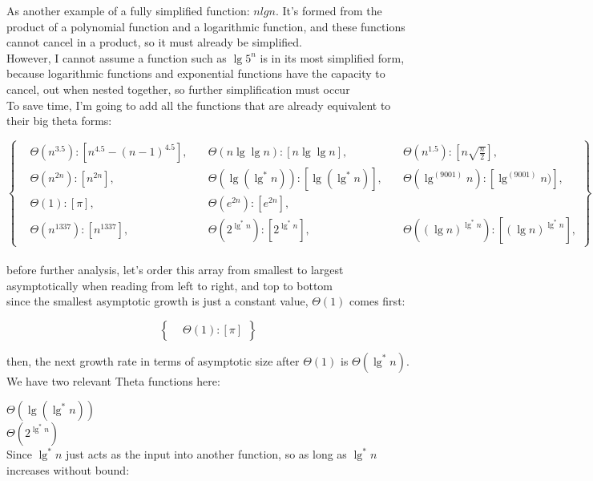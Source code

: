 \documentclass[11pt,fleqn]{article}
\theoremstyle{definition}
\theoremstyle{remark}
\begin{document}
As another example of a fully simplified function: $nlgn$. It's formed
from the product of a polynomial function and a logarithmic function, and
these functions cannot cancel in a product, so it must already be simplified.\\

However, I cannot assume a function such as $\lg 5^n$ is in its most 
simplified form, because logarithmic functions and exponential functions
have the capacity to cancel, out when nested together, so further 
simplification must occur\\

To save time, I'm going to add all the functions that are already 
equivalent to their big theta forms:

\[
\left\{
\begin{aligned}
& \Theta(n^{3.5}): [n^{4.5} - (n - 1)^{4.5}], 
& \quad \Theta(n \lg \lg n): [n \lg \lg n],
& \quad \Theta(n^{1.5}): [n\sqrt{\frac{n}{2}}],\\
& \Theta(n^{2n}): [n^{2n}],
& \quad \Theta(\lg(\lg^*n)): [\lg(\lg^*n)],
& \quad \Theta(\lg^{(9001)} n): [\lg^{(9001)} n)],\\
& \Theta(1): [\pi],
& \quad \Theta(e^{2n}): [e^{2n}],\\
& \Theta(n^{1337}): [n^{1337}],
& \quad \Theta(2^{\lg^*{n}}): [2^{\lg^*{n}}],
& \quad \Theta({(\lg n)}^{\lg^*{n}}): [{(\lg n)}^{\lg^*{n}}],
\end{aligned}
\right\}
\]\\

before further analysis, let's order this array from smallest
to largest asymptotically when reading from left to right, and top 
to bottom\\

since the smallest asymptotic growth is just a constant value,
$\Theta(1)$ comes first:

\[
\left\{
\begin{aligned}
& \Theta(1): [\pi]
\end{aligned}
\right\}
\]

then, the next growth rate in terms of asymptotic size after $\Theta(1)$
is $\Theta(\lg^*n)$. We have two relevant Theta functions here: 

$\Theta(\lg(\lg^*n))$\\
$\Theta(2^{\lg^*n})$\\

Since $\lg^*n$ just acts as the input into another function, 
so as long as $\lg^*n$ increases without bound:\\
\end{document}
